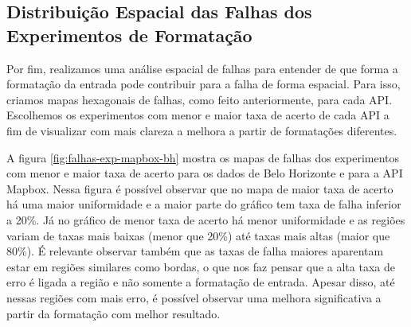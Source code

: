 \subsection{Distribuição Espacial das Falhas dos Experimentos de Formatação}

Por fim, realizamos uma análise espacial de falhas para entender de que forma a formatação da entrada pode contribuir para a falha de forma espacial. 
Para isso, criamos mapas hexagonais de falhas, como feito anteriormente, para cada API. Escolhemos os experimentos com menor e maior 
taxa de acerto de cada API a fim de visualizar com mais clareza a melhora a partir de formatações diferentes. 

A figura \ref{fig:falhas-exp-mapbox-bh} mostra os mapas de falhas dos experimentos com menor e maior taxa de acerto para os dados de Belo Horizonte e para a API Mapbox. Nessa figura é possível observar que no mapa de maior taxa de acerto há uma maior uniformidade e a maior parte do gráfico tem taxa de falha inferior a 20\%. Já no gráfico de menor taxa de acerto há menor uniformidade e as regiões variam de taxas mais baixas (menor que 20\%) até taxas mais altas (maior que 80\%). É relevante observar também que as taxas de falha maiores aparentam estar em regiões similares como bordas, o que nos faz pensar que a alta taxa de erro é ligada a região e não somente a formatação de entrada. Apesar disso, até nessas regiões com mais erro, é possível observar uma melhora significativa a partir da formatação com melhor resultado. 

